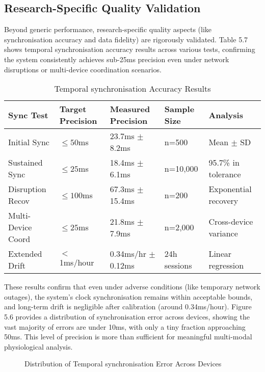 \documentclass[11pt,a4paper]{report}
\begin{document}
\subsection{Research-Specific Quality Validation}
Beyond generic performance, research-specific quality aspects (like synchronisation accuracy and data fidelity) are rigorously validated. Table 5.7 shows temporal synchronisation accuracy results across various tests, confirming the system consistently achieves sub-25ms precision even under network disruptions or multi-device coordination scenarios.
\begin{table}[h]
\centering
\caption{Temporal synchronisation Accuracy Results}
\label{tab:chapter5-7}
\begin{tabular}{lllll}
\toprule
\textbf{Sync Test} & \textbf{Target Precision} & \textbf{Measured Precision} & \textbf{Sample Size} & \textbf{Analysis} \\
\midrule
Initial Sync & $\leq 50$ms & 23.7ms $\pm$ 8.2ms & n=500 & Mean $\pm$ SD \\
Sustained Sync & $\leq 25$ms & 18.4ms $\pm$ 6.1ms & n=10,000 & 95.7\% in tolerance \\
Disruption Recov & $\leq 100$ms & 67.3ms $\pm$ 15.4ms & n=200 & Exponential recovery \\
Multi-Device Coord & $\leq 25$ms & 21.8ms $\pm$ 7.9ms & n=2,000 & Cross-device variance \\
Extended Drift & $<$1ms/hour & 0.34ms/hr $\pm$ 0.12ms & 24h sessions & Linear regression \\
\bottomrule
\end{tabular}
\end{table}
These results confirm that even under adverse conditions (like temporary network outages), the system’s clock synchronisation remains within acceptable bounds, and long-term drift is negligible after calibration (around 0.34ms/hour).
Figure 5.6 provides a distribution of synchronisation error across devices, showing the vast majority of errors are under 10ms, with only a tiny fraction approaching 50ms. This level of precision is more than sufficient for meaningful multi-modal physiological analysis.
\begin{figure}[h]
\centering
\caption{Distribution of Temporal synchronisation Error Across Devices}
\label{fig:chapter5-6}
\end{figure}
\end{document}
